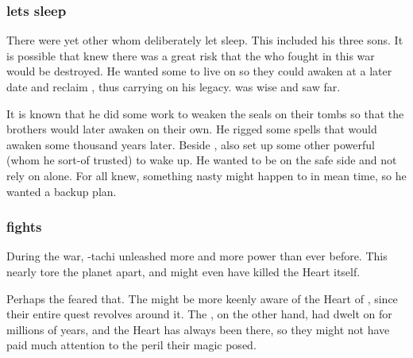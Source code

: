 \subsubsection{\Sethicus lets \Nexagglachel sleep}
There were yet other \dragons whom \Sethicus deliberately let sleep.
This included his three sons.
It is possible that \Sethicus knew there was a great risk that the \dragons who fought in this war would be destroyed. 
He wanted some \dragons to live on so they could awaken at a later date and reclaim \Miith, thus carrying on his legacy.
\Sethicus was wise and saw far.

It is known that he did some work to weaken the seals on their tombs so that the brothers would later awaken on their own.
He rigged some spells that would awaken \Nexagglachel some thousand years later.
Beside \Nexagglachel, \Sethicus also set up some other powerful \dragons (whom he sort-of trusted) to wake up. 
He wanted to be on the safe side and not rely on \Nexagglachel alone.
For all \Sethicus knew, something nasty might happen to \Nexagglachel in mean time, so he wanted a backup plan. 





\subsubsection{\Sethicus fights}
During the war, \Sethicus-tachi unleashed more \daemons{} and more \xzaishannic{} power than ever before. 
This nearly tore the planet apart, and might even have killed the Heart itself. 

Perhaps the \banes{} feared that. 
The \banes{} might be more keenly aware of the Heart of \Miith{}, since their entire quest revolves around it. 
The \ophidians, on the other hand, had dwelt on \Miith{} for millions of years, and the Heart has always been there, so they might not have paid much attention to the peril their magic posed. 


